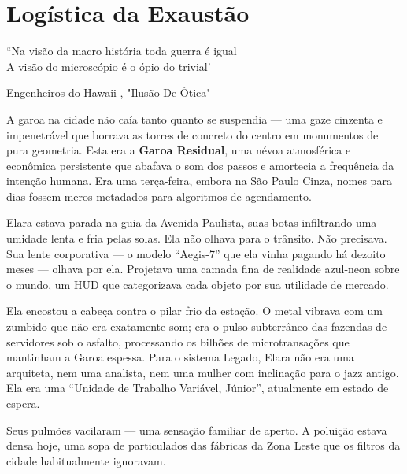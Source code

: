 
\chapter{Logística da Exaustão}
\epigraph{``Na visão da macro história toda guerra é igual \\ A visão do microscópio é o ópio do trivial'}{Engenheiros do Hawaii , "Ilusão De Ótica"}

A garoa na cidade não caía tanto quanto se suspendia --- uma gaze cinzenta e impenetrável que borrava as torres de concreto do centro em monumentos de pura geometria. Esta era a \textbf{Garoa Residual}, uma névoa atmosférica e econômica persistente que abafava o som dos passos e amortecia a frequência da intenção humana. Era uma terça-feira, embora na São Paulo Cinza, nomes para dias fossem meros metadados para algoritmos de agendamento.

Elara estava parada na guia da Avenida Paulista, suas botas infiltrando uma umidade lenta e fria pelas solas. Ela não olhava para o trânsito. Não precisava. Sua lente corporativa --- o modelo ``Aegis-7'' que ela vinha pagando há dezoito meses --- olhava por ela. Projetava uma camada fina de realidade azul-neon sobre o mundo, um HUD que categorizava cada objeto por sua utilidade de mercado.


Ela encostou a cabeça contra o pilar frio da estação. O metal vibrava com um zumbido que não era exatamente som; era o pulso subterrâneo das fazendas de servidores sob o asfalto, processando os bilhões de microtransações que mantinham a Garoa espessa. Para o sistema Legado, Elara não era uma arquiteta, nem uma analista, nem uma mulher com inclinação para o jazz antigo. Ela era uma ``Unidade de Trabalho Variável, Júnior'', atualmente em estado de espera.

Seus pulmões vacilaram --- uma sensação familiar de aperto. A poluição estava densa hoje, uma sopa de particulados das fábricas da Zona Leste que os filtros da cidade habitualmente ignoravam.


